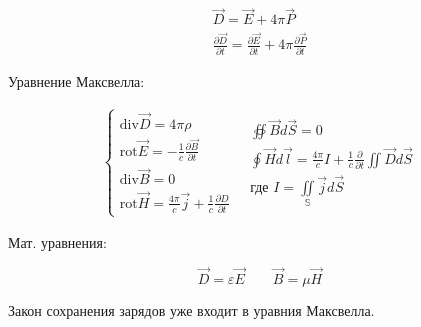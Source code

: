 \begin{gather*}
    \vec{D}=\vec{E}+4\pi\vec{P} \\
    \frac{\partial \vec{D}}{\partial t}= \frac{\partial \vec{E}}{\partial t} +4\pi \frac{\partial \vec{P}}{\partial t}  
\end{gather*}

Уравнение Максвелла:

\[
\begin{aligned}
    \begin{cases}
        \mathrm{div}\vec{D}=4\pi\rho \\
        \mathrm{rot}\vec{E}=-\frac{1}{c} \frac{\partial\vec{B}}{\partial t} \\
        \mathrm{div}\vec{B}=0 \\
        \mathrm{rot}\vec{H}=\frac{4\pi}{c}\vec{j}+\frac{1}{c} \frac{\partial D}{\partial t}      
    \end{cases}
    \text{ }
    \begin{array}{ll}
        \oiint \vec{B}d\vec{S}=0 \\
        \oint\vec{H}d\vec{l}=\frac{4\pi}{c}I+\frac{1}{c} \frac{\partial}{\partial t}\iint \vec{D}d\vec{S} \\
        \text{где } I=\underset{\mathbb{S}}{\iint}\vec{j}d\vec{S} 
    \end{array}
\end{aligned}
\]

Мат. уравнения:

\[
\vec{D}=\varepsilon\vec{E} \qquad \vec{B}=\mu\vec{H}
\]

Закон сохранения зарядов уже входит в уравния Максвелла.